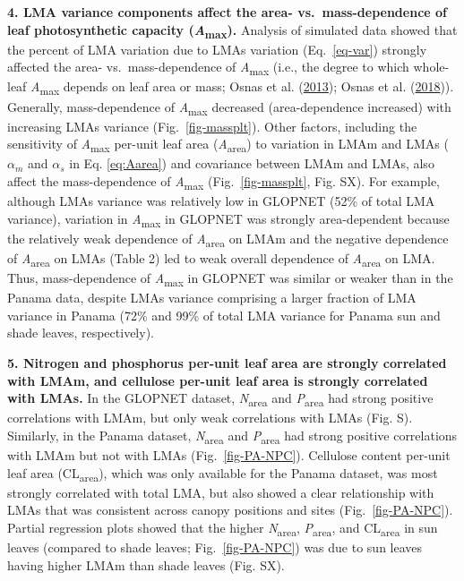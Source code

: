 \documentclass[
  12pt,
  a4paper,
,tablecaptionabove
]{scrartcl}
\begin{document}
\textbf{4. LMA variance components affect the area- vs.~mass-dependence
of leaf photosynthetic capacity (\emph{A}\textsubscript{max}).} Analysis
of simulated data showed that the percent of LMA variation due to LMAs
variation (Eq.~\ref{eq-var}) strongly affected the area-
vs.~mass-dependence of \emph{A}\textsubscript{max} (i.e., the degree to
which whole-leaf \emph{A}\textsubscript{max} depends on leaf area or
mass; Osnas et al. (\protect\hyperlink{ref-Osnas2013}{2013}); Osnas et
al. (\protect\hyperlink{ref-Osnas2018}{2018})). Generally,
mass-dependence of \emph{A}\textsubscript{max} decreased
(area-dependence increased) with increasing LMAs variance
(Fig.~\ref{fig-massplt}). Other factors, including the sensitivity of
\emph{A}\textsubscript{max} per-unit leaf area
(\emph{A}\textsubscript{area}) to variation in LMAm and LMAs
(\(\alpha_m\) and \(\alpha_s\) in Eq. \ref{eq:Aarea}) and covariance
between LMAm and LMAs, also affect the mass-dependence of
\emph{A}\textsubscript{max} (Fig.~\ref{fig-massplt}, Fig. SX). For
example, although LMAs variance was relatively low in GLOPNET (52\% of
total LMA variance), variation in \emph{A}\textsubscript{max} in GLOPNET
was strongly area-dependent because the relatively weak dependence of
\emph{A}\textsubscript{area} on LMAm and the negative dependence of
\emph{A}\textsubscript{area} on LMAs (Table 2) led to weak overall
dependence of \emph{A}\textsubscript{area} on LMA. Thus, mass-dependence
of \emph{A}\textsubscript{max} in GLOPNET was similar or weaker than in
the Panama data, despite LMAs variance comprising a larger fraction of
LMA variance in Panama (72\% and 99\% of total LMA variance for Panama
sun and shade leaves, respectively).

\textbf{5. Nitrogen and phosphorus per-unit leaf area are strongly
correlated with LMAm, and cellulose per-unit leaf area is strongly
correlated with LMAs.} In the GLOPNET dataset,
\emph{N}\textsubscript{area} and \emph{P}\textsubscript{area} had strong
positive correlations with LMAm, but only weak correlations with LMAs
(Fig. S). Similarly, in the Panama dataset, \emph{N}\textsubscript{area}
and \emph{P}\textsubscript{area} had strong positive correlations with
LMAm but not with LMAs (Fig.~\ref{fig-PA-NPC}). Cellulose content
per-unit leaf area (CL\textsubscript{area}), which was only available
for the Panama dataset, was most strongly correlated with total LMA, but
also showed a clear relationship with LMAs that was consistent across
canopy positions and sites (Fig.~\ref{fig-PA-NPC}). Partial regression
plots showed that the higher \emph{N}\textsubscript{area},
\emph{P}\textsubscript{area}, and CL\textsubscript{area} in sun leaves
(compared to shade leaves; Fig.~\ref{fig-PA-NPC}) was due to sun leaves
having higher LMAm than shade leaves (Fig. SX).
\end{document}

